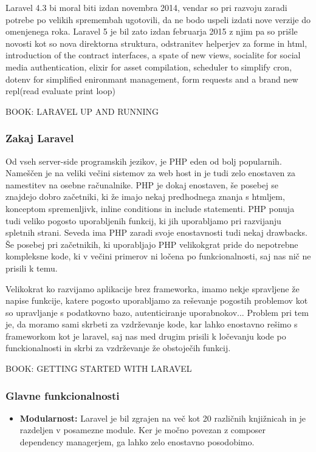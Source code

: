 \documentclass[12pt,a4paper,titlepage,openany]{report}
\begin{document}
Laravel 4.3 bi moral biti izdan novembra 2014, vendar so pri razvoju zaradi potrebe po velikih spremembah ugotovili, da ne bodo uspeli izdati nove verzije do omenjenega roka. Laravel 5 je bil zato izdan februarja 2015 z njim pa so prišle novosti kot so nova direktorna struktura, odstranitev helperjev za forme in html, introduction of the contract interfaces, a spate of new views, socialite for social media authentication, elixir for asset compilation, scheduler to simplify cron, dotenv for simplified enironmant management, form requests and a brand new repl(read evaluate print loop)


BOOK: LARAVEL UP AND RUNNING

\subsubsection{Zakaj Laravel}

Od vseh server-side programskih jezikov, je PHP eden od bolj popularnih. Nameščen je na veliki večini sistemov za web host in je tudi zelo enostaven za namestitev na osebne računalnike. PHP je dokaj enostaven, še posebej se znajdejo dobro začetniki, ki že imajo nekaj predhodnega znanja s htmljem, konceptom spremenljivk, inline conditions in include statementi. PHP ponuja tudi veliko pogosto uporabljenih funkcij, ki jih uporabljamo pri razvijanju spletnih strani. Seveda ima PHP zaradi svoje enostavnosti tudi nekaj drawbacks. Še posebej pri začetnikih, ki uporabljajo PHP velikokgrat pride do nepotrebne kompleksne kode, ki v večini primerov ni ločena po funkcionalnosti, saj nas nič ne prisili k temu. 

Velikokrat ko razvijamo aplikacije brez frameworka, imamo nekje spravljene že napise funkcije, katere pogosto uporabljamo za reševanje pogostih problemov kot so upravljanje s podatkovno bazo, autenticiranje uporabnokov... Problem pri tem je, da moramo sami skrbeti za vzdrževanje kode, kar lahko enostavno rešimo s frameworkom kot je laravel, saj nas med drugim prisili k ločevanju kode po funckionalnosti in skrbi za vzdrževanje že obstoječih funkcij.

BOOK: GETTING STARTED WITH LARAVEL

\subsubsection{Glavne funkcionalnosti}

\begin{itemize}
\item \textbf{Modularnost:} Laravel je bil zgrajen na več kot 20 različnih knjižnicah in je razdeljen v posamezne module. Ker je močno povezan z composer dependency managerjem, ga lahko zelo enostavno posodobimo.
\end{itemize}
\end{document}
